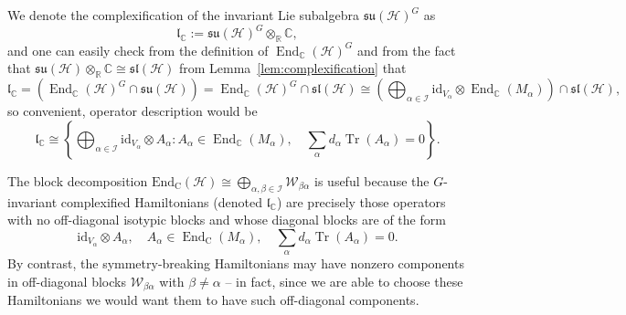\documentclass[11pt,letterpaper]{article}
\newcounter{alg}
\theoremstyle{plain}
\theoremstyle{plain}
\theoremstyle{plain}
\theoremstyle{plain}
\theoremstyle{plain}
\theoremstyle{plain}
\newcommand{\C}{\mathbb{C}}
\newcommand{\R}{\mathbb{R}}
\newcommand{\HH}{\mathcal{H}}
\theoremstyle{plain}
\theoremstyle{definition}
\theoremstyle{plain}
\begin{document}
We denote the complexification of the invariant Lie subalgebra $\mathfrak{su}(\HH)^G$ as
\[
    \mathfrak{l}_\C := \mathfrak{su}(\HH)^G \otimes_{\R} \C,
\]
and one can easily check from the definition of $\operatorname{End}_{\C}(\HH)^G$ and from the fact that $\mathfrak{su}(\HH) \otimes_{\R} \C \cong \mathfrak{sl}(\HH)$ from Lemma~\ref{lem:complexification} that
\begin{equation*}
    \mathfrak{l}_\C = \left(\operatorname{End}_{\C}(\HH)^G \cap \mathfrak{su}(\HH) \right) = \operatorname{End}_{\C}(\HH)^G\cap \mathfrak{sl}(\HH)\cong\left(\bigoplus_{\alpha \in \mathcal{I}} \mathrm{id}_{V_\alpha} \otimes \operatorname{End}_{ \mathbb{C}}\left(M_\alpha\right)\right) \cap \mathfrak{sl}(\HH),
\end{equation*}
so convenient, operator description would be
\begin{equation}\label{eq:compl_inv_alg}
    \mathfrak{l}_\C \cong \left\{\bigoplus_{\alpha \in \mathcal{I}} \mathrm{id}_{V_\alpha} \otimes A_\alpha: A_\alpha \in \operatorname{End}_\C(M_{\alpha}), \quad \sum_\alpha d_\alpha \operatorname{Tr}\left(A_\alpha\right)=0\right\}.
\end{equation}

The block decomposition
$
\text{End}_{\mathrm{C}}(\HH) \cong \bigoplus_{\alpha, \beta \in \mathcal{I}} \mathcal{W}_{\beta \alpha}
$
is useful because the $G$-invariant complexified Hamiltonians (denoted $\mathfrak{l}_\C$) are precisely those operators with no off-diagonal isotypic blocks and whose diagonal blocks are of the form
$$
\mathrm{id}_{V_\alpha} \otimes A_\alpha, \quad A_\alpha \in \operatorname{End}_{\mathrm{C}}\left(M_\alpha\right), \quad \sum_\alpha d_\alpha \operatorname{Tr}\left(A_\alpha\right)=0 .
$$
By contrast, the symmetry-breaking Hamiltonians may have nonzero components in off-diagonal blocks $\mathcal{W}_{\beta \alpha}$ with $\beta \neq \alpha$ -- in fact, since we are able to choose these Hamiltonians we would want them to have such off-diagonal components. 
\end{document}
